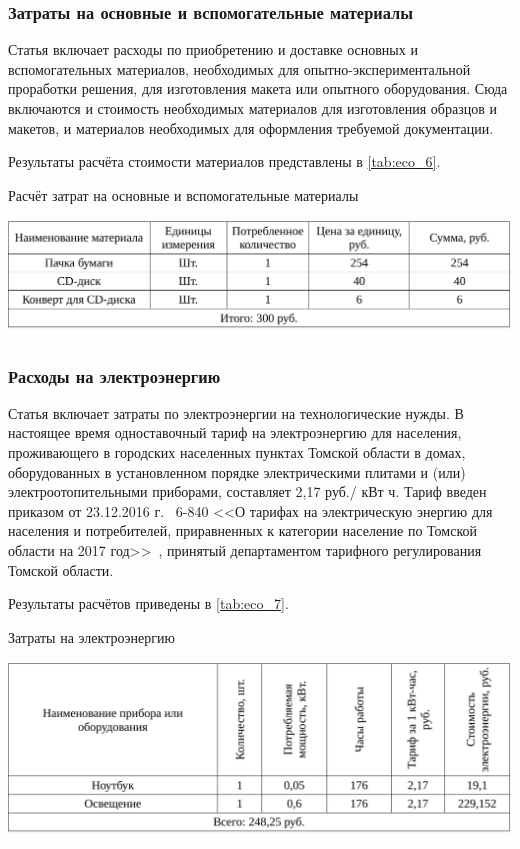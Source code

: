 \subsubsection{Затраты на основные и вспомогательные материалы}

Статья включает расходы по приобретению и доставке основных и вспомогательных материалов, необходимых для опытно-экспериментальной проработки 
решения, для изготовления макета или опытного оборудования. Сюда включаются и стоимость необходимых материалов для изготовления образцов и 
макетов, и материалов необходимых для оформления требуемой документации.

Результаты расчёта стоимости материалов представлены в \ref{tab:eco_6}.

\begin{table}[!ht]
\caption{Расчёт затрат на основные и вспомогательные материалы}
\centering
\includegraphics[page=1, width=1\linewidth]{tables/economics/econom.pdf}
\label{tab:eco_6}
\end{table}


\subsubsection{Расходы на электроэнергию}

Статья включает затраты по электроэнергии на технологические нужды. В настоящее время одноставочный
тариф на электроэнергию для населения, проживающего в городских населенных
пунктах Томской области в домах, оборудованных в установленном порядке электрическими 
плитами и (или) электроотопительными приборами,
составляет 2,17 руб./ кВт ч. Тариф введен 
приказом от 23.12.2016 г. \textnumero~6-840 <<О тарифах на электрическую энергию для населения и 
потребителей, приравненных к категории население по Томской области на 2017 год>>~\cite{electr}, 
принятый департаментом тарифного регулирования Томской области.

Результаты расчётов приведены в \ref{tab:eco_7}.

\begin{table}[ht!]
\caption{Затраты на электроэнергию}
\centering
\includegraphics[page=1, width=1\linewidth]{tables/economics/econom_2.pdf}
\label{tab:eco_7}
\end{table}


